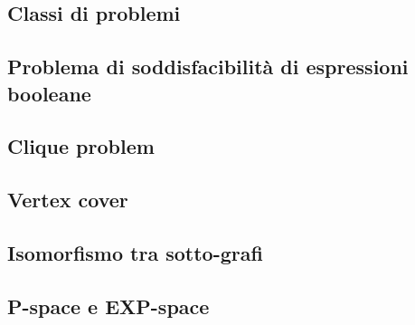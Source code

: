 \documentclass{subfiles}
\begin{document}
\subsection{Classi di problemi}


\subsection{Problema di soddisfacibilità di espressioni booleane}

\clearpage

\subsection{Clique problem}

\clearpage

\subsection{Vertex cover}

\clearpage

\subsection{Isomorfismo tra sotto-grafi}


\subsection{P-space e EXP-space}

\end{document}
